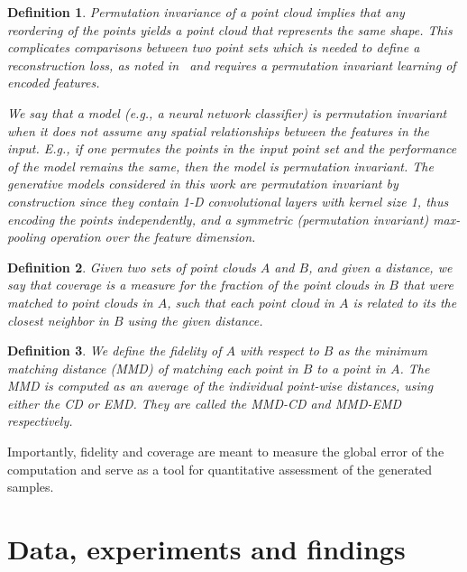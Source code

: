 \documentclass[12pt]{article}
\newtheorem{definition}{Definition}
\begin{document}
    \begin{definition}
        \normalfont
        \textit{Permutation invariance} of a point cloud implies that any reordering of the points yields a point cloud that represents the same shape. This complicates comparisons between two point sets which is needed to define a reconstruction loss, as noted in~\cite{pmlr-v80-achlioptas18a} and requires a permutation invariant learning of encoded features.

        We say that a model (e.g., a neural network classifier) is \emph{permutation invariant} when it does not assume any spatial relationships between the features in the input. E.g., if one permutes the points in the input point set and the performance of the model remains the same, then the model is permutation invariant.
        The generative models considered in this work are permutation invariant by construction since they contain 1-D convolutional layers with kernel size 1, thus encoding the points \textit{independently}, and a symmetric (permutation invariant) max-pooling operation over the feature dimension.
        \label{definition:invariance}
    \end{definition}

    \begin{definition}
        \normalfont
        Given two sets of point clouds $A$ and $B$, and given a distance, we say that \emph{coverage} is a measure for the fraction of the point clouds in $B$ that were matched to point clouds in $A$, such that each point cloud in $A$ is related to its the closest neighbor in $B$ using the given distance.
        \label{definition:coverage}
    \end{definition}

    \begin{definition}
        \normalfont
        We define the \emph{fidelity} of $A$ with respect to $B$ as the \emph{minimum matching distance} (MMD) of matching each point in $B$ to a point in $A$.
        The \emph{MMD} is computed as an average of the individual point-wise distances, using either the CD or EMD.
        They are called the \emph{MMD-CD} and \emph{MMD-EMD} respectively.
        \label{definition:fidelity}
    \end{definition}

    Importantly, fidelity and coverage are meant to measure the global error of the computation and serve as a tool for quantitative assessment of the generated samples.


    \section{Data, experiments and findings}
    \label{sec:data_experiments_findings}
\end{document}
